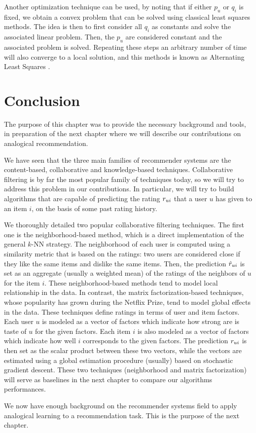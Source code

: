 Another optimization technique can be used, by noting that if either $p_u$ or
$q_i$ is fixed, we obtain a convex problem that can be solved using classical
least squares methods. The idea is then to first consider all $q_i$ as
constants and solve the associated linear problem. Then, the $p_u$ are
considered constant and the associated problem is solved. Repeating these steps
an arbitrary number of time will also converge to a local solution, and this
methods is known as Alternating Least Squares \cite{BelKor07}.

\section*{Conclusion}

The purpose of this chapter was to provide the necessary background and tools,
in preparation of the next chapter where we will describe our contributions on
analogical recommendation.

We have seen that the three main families of recommender systems are the
content-based, collaborative and knowledge-based techniques. Collaborative
filtering is by far the most popular family of techniques today, so we will try
to address this problem in our contributions. In particular, we will try to
build algorithms that are capable of predicting the rating $r_{ui}$ that a user
$u$ has given to an item $i$, on the basis of some past rating history.

We thoroughly detailed two popular collaborative filtering techniques. The
first one is the neighborhood-based method, which is a direct implementation of
the general $k$-NN strategy. The neighborhood of each user is computed using a
similarity metric that is based  on the ratings: two users are considered close
if they like the same items and dislike the same items. Then, the prediction
$\hat{r}_{ui}$ is set as an aggregate (usually a weighted mean) of the ratings of
the neighbors of $u$ for the item $i$. These neighborhood-based methods tend to
model local relationship in the data. In contrast, the matrix
factorization-based techniques, whose popularity has grown during the Netflix
Prize, tend to model global effects in the data. These techniques define ratings
in terms of user and item factors. Each user $u$ is modeled as a vector of
factors which indicate how strong are is taste of $u$ for the given factors.
Each item $i$ is also modeled as a vector of factors which indicate how well
$i$ corresponds to the given factors. The prediction $r_{ui}$ is then set as the
scalar product between these two vectors, while the vectors are estimated using
a global estimation procedure (usually) based on stochastic gradient descent.
These two techniques (neighborhood and matrix factorization) will serve as
baselines in the next chapter to compare our algorithms performances.

We now have enough background on the recommender systems field to apply
analogical learning to a recommendation task. This is the purpose of the next
chapter.

